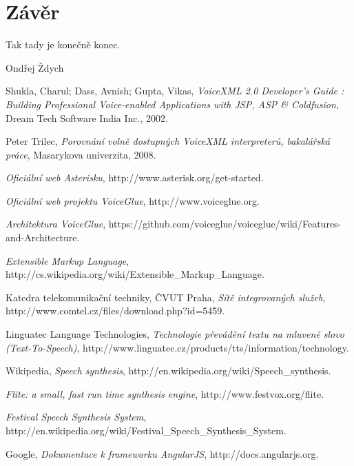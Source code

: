 \documentclass[ing,male,java,dept460]{diploma}						%
\begin{document}
\section{Závěr}
\label{sec:Conclusion}
Tak tady je konečně konec.

\bigskip
\begin{flushright}
Ondřej Ždych
\end{flushright}

\begin{thebibliography}{99}

 Shukla, Charul; Dass, Avnish; Gupta, Vikas,
\textit{VoiceXML 2.0 Developer's Guide : Building Professional Voice-enabled Applications with JSP, ASP & Coldfusion}, Dream Tech Software India Inc., 2002.

 Peter Trilec,
\textit{Porovnání volně dostupných VoiceXML interpreterů, bakalářská práce}, Masarykova univerzita, 2008.

\textit{Oficiální web Asterisku}, http://www.asterisk.org/get-started.

\textit{Oficiální web projektu VoiceGlue}, http://www.voiceglue.org.

\textit{Architektura VoiceGlue}, https://github.com/voiceglue/voiceglue/wiki/Features-and-Architecture.

\textit{Extensible Markup Language}, http://cs.wikipedia.org/wiki/Extensible\_Markup\_Language.

 Katedra telekomunikační techniky, ČVUT Praha,
\textit{Sítě integrovaných služeb}, http://www.comtel.cz/files/download.php?id=5459‎.

 Linguatec Language Technologies,
\textit{Technologie převádění textu na mluvené slovo (Text-To-Speech)}, http://www.linguatec.cz/products/tts/information/technology.

 Wikipedia,
\textit{Speech synthesis}, http://en.wikipedia.org/wiki/Speech\_synthesis.

\textit{Flite: a small, fast run time synthesis engine}, http://www.festvox.org/flite.

\textit{Festival Speech Synthesis System}, http://en.wikipedia.org/wiki/Festival_Speech_Synthesis_System.

 Google,
\textit{Dokumentace k frameworku AngularJS}, http://docs.angularjs.org.


\end{thebibliography}
\end{document}

